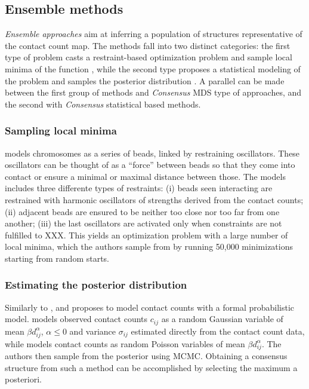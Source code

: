 \documentclass[letterpaper,12pt]{article}
\begin{document}
\subsection*{Ensemble methods}

{\em Ensemble approaches} aim at inferring a population of structures
representative of the contact count map. The methods fall into two distinct
categories: the first type of problem casts a restraint-based 
optimization problem and sample local minima of the function
\citep{bau:three-dimensional, umbarger:three-dimensional}, while the second
type proposes a statistical modeling of the problem and samples the posterior
distribution \citep{rousseau:three, hu:bayesian}. A parallel can be made
between the first group of methods and {\em Consensus} MDS type of approaches,
and the second with {\em Consensus} statistical based methods.

\subsubsection*{Sampling local minima}

\citet{umbarger:three-dimensional,bau:three-dimensional, kalhor:genome} models
chromosomes as a series of beads, linked by restraining oscillators. These
oscillators can be thought of as a ``force'' between beads so that they come
into contact or ensure a minimal or maximal distance between those. The models
includes three differente types of restraints: (i) beads seen interacting are
restrained with harmonic oscillators of strengths derived from the contact
counts; (ii) adjacent beads are ensured to be neither too close nor too far
from one another; (iii) the last oscillators are activated only when
constraints are not fulfilled to XXX.  This yields an optimization problem
with a large number of local minima, which the authors sample from by running
50,000 minimizations starting from random starts.

\subsubsection*{Estimating the posterior distribution}

Similarly to \citet{varoquaux:statistical}, \citet{rousseau:three} and
\citet{hu:bayesian} proposes to model contact counts with a formal
probabilistic model. \citet{rousseau:three} models observed contact counts
$c_{ij}$ as a random Gaussian variable of mean $\beta d_{ij}^{\alpha}$,
$\alpha \leq 0$ and variance $\sigma_{ij}$ estimated directly from the contact
count data, while \citet{hu:bayesian} models contact counts as random Poisson
variables of mean $\beta d_{ij}^\alpha$. The authors then sample from the
posterior using MCMC. Obtaining a consensus structure from such a method can
be accomplished by selecting the maximum a posteriori.
\end{document}

